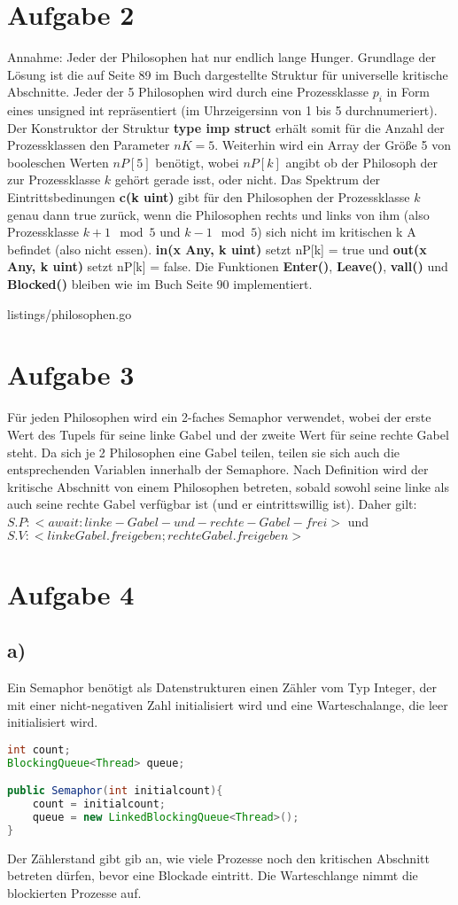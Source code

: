 \documentclass[11pt,a4paper,DIV=10,]{scrartcl}
\begin{document}
\section*{Aufgabe 2}
Annahme: Jeder der Philosophen hat nur endlich lange Hunger. 
Grundlage der Lösung ist die auf Seite 89 im Buch dargestellte Struktur für universelle kritische Abschnitte. Jeder der 5 Philosophen wird durch eine Prozessklasse $p_i$ in Form eines unsigned int repräsentiert (im Uhrzeigersinn von 1 bis 5 durchnumeriert). Der Konstruktor der Struktur \textbf{type imp struct} erhält somit für die Anzahl der Prozessklassen den Parameter $nK=5$. Weiterhin wird ein Array der Größe 5 von booleschen Werten $nP[5]$ benötigt, wobei $nP[k]$ angibt ob der Philosoph der zur Prozessklasse $k$ gehört gerade isst, oder nicht.   Das Spektrum der Eintrittsbedinungen \textbf{c(k uint)} gibt für den Philosophen der Prozessklasse $k$ genau dann true zurück, wenn die Philosophen rechts und links von ihm (also Prozessklasse $k+1 \mod 5$ und $k-1 \mod 5$) sich nicht im kritischen k A befindet (also nicht essen). \textbf{in(x Any, k uint)} setzt nP[k] = true und \textbf{out(x Any, k uint)} setzt nP[k] = false. Die Funktionen \textbf{Enter()}, \textbf{Leave()}, \textbf{vall()} und \textbf{Blocked()} bleiben wie im Buch Seite 90 implementiert.


{listings/philosophen.go}
\section*{Aufgabe 3}

Für jeden Philosophen wird ein 2-faches Semaphor verwendet, wobei der erste Wert des Tupels für seine linke Gabel und der zweite Wert für seine rechte Gabel steht.  Da sich je 2 Philosophen eine Gabel teilen, teilen sie sich auch die entsprechenden Variablen innerhalb der Semaphore. Nach Definition wird der kritische Abschnitt von einem Philosophen betreten, sobald sowohl seine linke als auch seine rechte Gabel verfügbar ist (und er eintrittswillig ist). Daher gilt: $S.P: < await: linke-Gabel-und-rechte-Gabel-frei> $ und $S.V: <linkeGabel.freigeben; rechteGabel.freigeben>$
\section*{Aufgabe 4}
\subsection*{a)}
Ein Semaphor benötigt als Datenstrukturen einen Zähler vom Typ Integer, der mit einer nicht-negativen Zahl initialisiert wird und eine Warteschalange, die leer initialisiert wird. 
\begin{lstlisting}[language=JAVA]
int count;
BlockingQueue<Thread> queue;

public Semaphor(int initialcount){
	count = initialcount;
	queue = new LinkedBlockingQueue<Thread>();
}
\end{lstlisting}
Der Zählerstand gibt gib an, wie viele Prozesse noch den kritischen Abschnitt betreten dürfen, bevor eine Blockade eintritt. Die Warteschlange nimmt die blockierten Prozesse auf.
\end{document}
